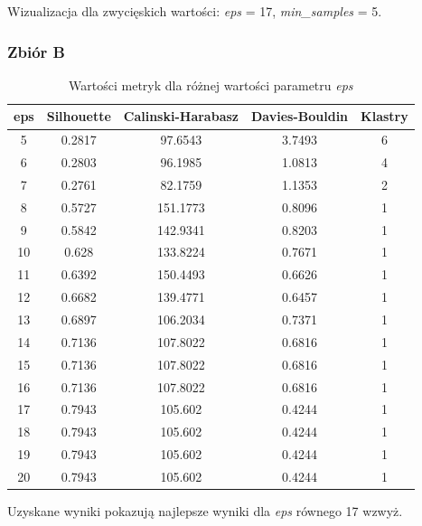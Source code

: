 \documentclass[a4paper,11pt]{article}
\begin{document}
Wizualizacja dla zwycięskich wartości: \textit{eps} = 17, \textit{min\_samples} = 5.

\subsubsection*{Zbiór B}

\begin{table}[H]
\centering
\begin{tabular}{|c|c|c|c|c|}
\hline
\textbf{eps} & \textbf{Silhouette} & \textbf{Calinski-Harabasz} & \textbf{Davies-Bouldin} & \textbf{Klastry} \\ \hline
5 & 0.2817 & 97.6543 & 3.7493 & 6 \\ \hline
6 & 0.2803 & 96.1985 & 1.0813 & 4 \\ \hline
7 & 0.2761 & 82.1759 & 1.1353 & 2 \\ \hline
8 & 0.5727 & 151.1773 & 0.8096 & 1 \\ \hline
9 & 0.5842 & 142.9341 & 0.8203 & 1 \\ \hline
10 & 0.628 & 133.8224 & 0.7671 & 1 \\ \hline
11 & 0.6392 & 150.4493 & 0.6626 & 1 \\ \hline
12 & 0.6682 & 139.4771 & 0.6457 & 1 \\ \hline
13 & 0.6897 & 106.2034 & 0.7371 & 1 \\ \hline
14 & 0.7136 & 107.8022 & 0.6816 & 1 \\ \hline
15 & 0.7136 & 107.8022 & 0.6816 & 1 \\ \hline
16 & 0.7136 & 107.8022 & 0.6816 & 1 \\ \hline
17 & 0.7943 & 105.602 & 0.4244 & 1 \\ \hline
18 & 0.7943 & 105.602 & 0.4244 & 1 \\ \hline
19 & 0.7943 & 105.602 & 0.4244 & 1 \\ \hline
20 & 0.7943 & 105.602 & 0.4244 & 1 \\ \hline

\end{tabular}
\caption{Wartości metryk dla różnej wartości parametru \textit{eps}}
\label{tab:dbscan21}
\end{table}

Uzyskane wyniki pokazują najlepsze wyniki dla \textit{eps} równego 17 wzwyż.
\end{document}
